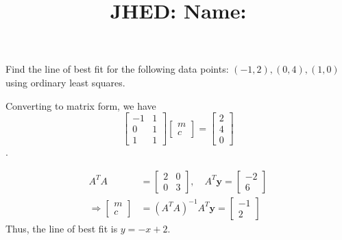 \documentclass[reqno]{exam}
\title{\normalsize{
  JHED: \underline{\hspace{4cm}} \hspace{1em} Name: \underline{\hspace{9cm}}}
   }
\author{}
\date{}
\begin{document}
\maketitle
\vspace{-2cm} %

\begin{questions}

\question 
Find the line of best fit for the following data points: $(-1, 2), (0, 4), (1, 0)$ using ordinary least squares.
\begin{solution}
Converting to matrix form, we have
\[\begin{bmatrix}
-1 & 1 \\
0 & 1 \\
1 & 1
\end{bmatrix}
\begin{bmatrix}m \\ c
\end{bmatrix} =
\begin{bmatrix}2 \\ 4 \\ 0
\end{bmatrix}\].

\begin{align*}
  A^T A &= \begin{bmatrix}2 & 0 \\ 0 & 3
\end{bmatrix}, \quad
A^T \mathbf{y} = \begin{bmatrix}-2 \\ 6
\end{bmatrix} \\
\Rightarrow \begin{bmatrix}m \\ c
\end{bmatrix} &= (A^T A)^{-1} A^T \mathbf{y} = \begin{bmatrix}-1 \\ 2  \end{bmatrix}
\end{align*}
Thus, the line of best fit is $y = -x + 2$.
\end{solution}

\newpage
\question
{}
\end{questions}
\end{document}
